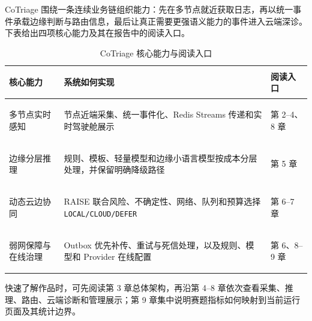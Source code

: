 CoTriage 围绕一条连续业务链组织能力：先在多节点就近获取日志，再以统一事件承载边缘判断与路由信息，最后让真正需要更强语义能力的事件进入云端深诊。下表给出四项核心能力及其在报告中的阅读入口。

\begin{table}[htbp]
  \centering
  \small
  \caption{CoTriage 核心能力与阅读入口}
  \label{tab:review-matrix}
  \begin{tabularx}{\textwidth}{>{\bfseries\raggedright\arraybackslash}p{} X >{\raggedright\arraybackslash}p{}}
    \toprule
    核心能力 & 系统如何实现 & 阅读入口 \\
    \midrule
    多节点实时感知 & 节点近端采集、统一事件化、Redis Streams 传递和实时驾驶舱展示 & 第 2--4、8 章 \\
    边缘分层推理 & 规则、模板、轻量模型和边缘小语言模型按成本分层处理，并保留明确降级路径 & 第 5 章 \\
    动态云边协同 & RAISE 联合风险、不确定性、网络、队列和预算选择 \texttt{LOCAL/CLOUD/DEFER} & 第 6--7 章 \\
    弱网保障与在线治理 & Outbox 优先补传、重试与死信处理，以及规则、模型和 Provider 在线配置 & 第 6、8--9 章 \\
    \bottomrule
  \end{tabularx}
\end{table}

\begin{tcolorbox}[
  colback=CoTriageGray,
  colframe=CoTriageCyan,
  boxrule=0.7pt,
  arc=1mm,
  title={建议阅读路径},
  coltitle=CoTriageNavy,
  fonttitle=\bfseries\sffamily
]
快速了解作品时，可先阅读第 3 章总体架构，再沿第 4--8 章依次查看采集、推理、路由、云端诊断和管理展示；第 9 章集中说明赛题指标如何映射到当前运行页面及其统计边界。
\end{tcolorbox}
